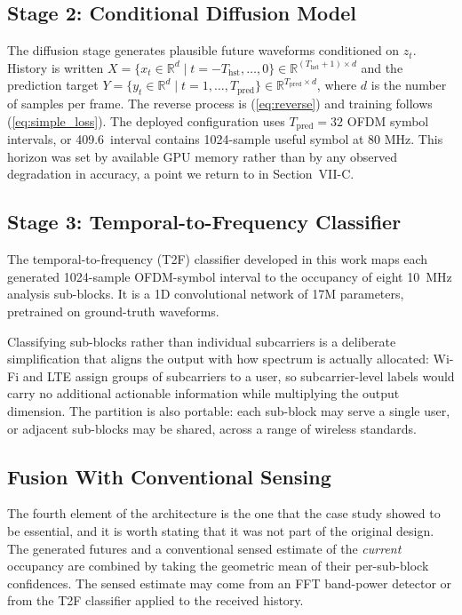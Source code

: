 \documentclass[lettersize,journal]{IEEEtran}
\begin{document}
\subsection{\textbf{Stage 2: Conditional Diffusion Model}}
The diffusion stage generates plausible future waveforms conditioned on
$z_t$. History is written
$X = \{x_t \in \mathbb{R}^d \mid t = -T_{\mathrm{hst}}, \ldots, 0\}
\in \mathbb{R}^{(T_{\mathrm{hst}}+1)\times d}$
and the prediction target
$Y = \{y_t \in \mathbb{R}^d \mid t = 1, \ldots, T_{\mathrm{pred}}\}
\in \mathbb{R}^{T_{\mathrm{pred}}\times d}$,
where $d$ is the number of samples per frame. The reverse process is
(\ref{eq:reverse}) and training follows (\ref{eq:simple_loss}). The
deployed configuration uses $T_{\mathrm{pred}} = 32$ OFDM symbol intervals, or
 409.6~\uswheneach interval contains 1024-sample useful symbol at 80 MHz.
This horizon was set by available GPU memory
rather than by any observed degradation in accuracy, a point we return
to in Section~VII-C.

\subsection{\textbf{Stage 3: Temporal-to-Frequency Classifier}}
The temporal-to-frequency (T2F) classifier 
developed in this work maps each generated 1024-sample
OFDM-symbol interval
to the occupancy of eight 10~MHz analysis sub-blocks. It is a 1D
convolutional network of 17M parameters, pretrained on ground-truth
waveforms.

Classifying sub-blocks rather than individual subcarriers is a
deliberate simplification that aligns the output with how spectrum is
actually allocated: Wi-Fi and LTE assign groups of subcarriers to a
user, so subcarrier-level labels would carry no additional actionable
information while multiplying the output dimension. The partition is also
portable: each sub-block may serve a single user, or adjacent sub-blocks may be
shared, across a range of wireless standards.

\subsection{\textbf{Fusion With Conventional Sensing}}
The fourth element of the architecture is the one that the case study
showed to be essential, and it is worth stating that it was not part of
the original design. The generated futures and a conventional sensed
estimate of the \emph{current} occupancy are combined by taking the
geometric mean of their per-sub-block confidences. The sensed estimate
may come from an FFT band-power detector or from the T2F classifier
applied to the received history.
\end{document}
